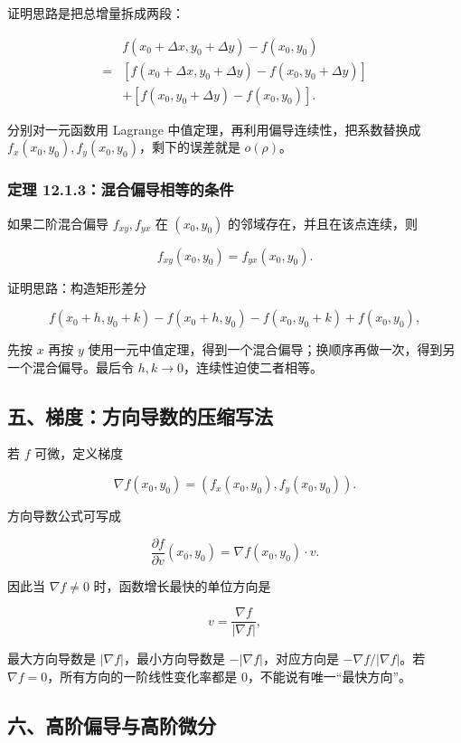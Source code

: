 证明思路是把总增量拆成两段：

\[
      \begin{aligned}
      &f(x_0+\Delta x,y_0+\Delta y)-f(x_0,y_0)\\
      ={}&[f(x_0+\Delta x,y_0+\Delta y)-f(x_0,y_0+\Delta y)]\\
      &+[f(x_0,y_0+\Delta y)-f(x_0,y_0)].
      \end{aligned}
    \]

分别对一元函数用 Lagrange 中值定理，再利用偏导连续性，把系数替换成 \(f_x(x_0,y_0),f_y(x_0,y_0)\)，剩下的误差就是 \(o(\rho)\)。

\subsubsection*{定理 12.1.3：混合偏导相等的条件}

如果二阶混合偏导 \(f_{xy},f_{yx}\) 在 \((x_0,y_0)\) 的邻域存在，并且在该点连续，则

\[
      f_{xy}(x_0,y_0)=f_{yx}(x_0,y_0).
    \]

证明思路：构造矩形差分

\[
      f(x_0+h,y_0+k)-f(x_0+h,y_0)-f(x_0,y_0+k)+f(x_0,y_0),
    \]

先按 \(x\) 再按 \(y\) 使用一元中值定理，得到一个混合偏导；换顺序再做一次，得到另一个混合偏导。最后令 \(h,k\to0\)，连续性迫使二者相等。

\subsection*{五、梯度：方向导数的压缩写法}

若 \(f\) 可微，定义梯度

\[
      \nabla f(x_0,y_0)=
      \left(f_x(x_0,y_0),f_y(x_0,y_0)\right).
    \]

方向导数公式可写成

\[
      \frac{\partial f}{\partial v}(x_0,y_0)=\nabla f(x_0,y_0)\cdot v.
    \]

因此当 \(\nabla f\ne0\) 时，函数增长最快的单位方向是

\[
      v=\frac{\nabla f}{|\nabla f|},
    \]

最大方向导数是 \(|\nabla f|\)，最小方向导数是 \(-|\nabla f|\)，对应方向是 \(-\nabla f/|\nabla f|\)。若 \(\nabla f=0\)，所有方向的一阶线性变化率都是 \(0\)，不能说有唯一“最快方向”。

\subsection*{六、高阶偏导与高阶微分}

